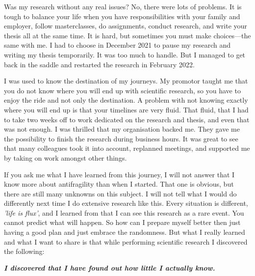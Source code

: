 Was my research without any real issues? No, there were lots of problems. It is tough to balance your life when you have responsibilities with your family and employer, follow masterclasses, do assignments, conduct research, and write your thesis all at the same time. It is hard, but sometimes you must make choices—the same with me. I had to choose in December 2021 to pause my research and writing my thesis temporarily. It was too much to handle. But I managed to get back in the saddle and restarted the research in February 2022.

I was used to know the destination of my journeys. My promotor taught me that you do not know where you will end up with scientific research, so you have to enjoy the ride and not only the destination. A problem with not knowing exactly where you will end up is that your timelines are very fluid. That fluid, that I had to take two weeks off to work dedicated on the research and thesis, and even that was not enough. I was thrilled that my organisation backed me. They gave me the possibility to finish the research during business hours. It was great to see that many colleagues took it into account, replanned meetings, and supported me by taking on work amongst other things. 

If you ask me what I have learned from this journey, I will not answer that I know more about \gls{antifragility} than when I started. That one is obvious, but there are still many unknowns on this subject. I will  not tell what I would do differently next time I do extensive research like this. Every situation is different, \textit{'life is flux'}, and I learned from \textcite{Taleb2012} that I can see this research as a rare event. You cannot predict what will happen. So how can I prepare myself better then just having a good plan and just embrace the randomness. But what I really learned and what I want to share is that while performing scientific research I discovered the following:\\

\vspace{\baselineskip}
\begin{center}
\noindent \textit{\textbf{I discovered that I have found out how little I actually know.}}
\end{center}